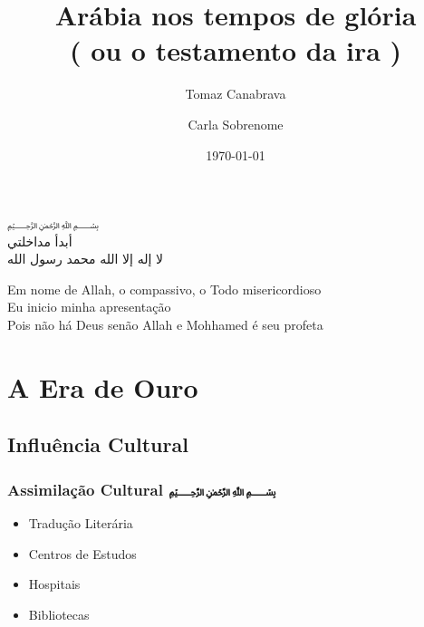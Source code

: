 \documentclass{beamer}
\title{ Arábia nos tempos de glória \\( ou o testamento da ira )}
\author{ Tomaz {Canabrava} \and Carla {Sobrenome}}
\institute{ IFSP - HTO \\ Instituto federal de São Paulo, Campus Hortolândia}
\date{\today}
\begin{document}
\begin{frame}
	\begin{center}
		\textarabic{﷽\\أبدأ مداخلتي\\ لا إله إلا الله محمد رسول الله}
	\end{center}
\end{frame}

\begin{frame}
	\begin{center}
		Em nome de Allah, o compassivo, o Todo misericordioso\\
		Eu inicio minha apresentação\\
		Pois não há Deus senão Allah e Mohhamed é seu profeta
	\end{center}
\end{frame}

\begin{frame}
 \titlepage
\end{frame}

\section{A Era de Ouro}
\subsection{Influência Cultural}

\begin{frame} \frametitle{ Assimilação Cultural \hfill \textarabic{﷽}}
	\begin{itemize}
		\item Tradução Literária
		\item Centros de Estudos
		\item Hospitais
		\item Bibliotecas
		\end{itemize}
\end{frame}
\end{document}
